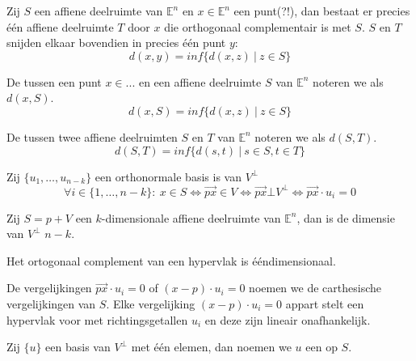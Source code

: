 \documentclass[main.tex]{subfiles}
\begin{document}
\begin{st}
  Zij $S$ een affiene deelruimte van $\mathbb{E}^{n}$ en $x\in \mathbb{E}^{n}$ een punt(?!), dan bestaat er precies \'e\'en affiene deelruimte $T$ door $x$ die orthogonaal complementair is met $S$.
  $S$ en $T$ snijden elkaar bovendien in precies \'e\'en punt $y$:
  \[ d(x,y) = inf\{ d(x,z) \ |\ z \in S  \} \]
\end{st}

\begin{de}
  De  tussen een punt $x\in ...$ en een affiene deelruimte $S$ van $\mathbb{E}^{n}$ noteren we als $d(x,S)$.
  \[ d(x,S) = inf\{ d(x,z)\ |\ z \in S \} \]
\end{de}

\begin{de}
  De  tussen twee affiene deelruimten $S$ en $T$ van $\mathbb{E}^{n}$ noteren we als $d(S,T)$.
  \[ d(S,T) = inf\{ d(s,t) \ |\ s\in S, t\in T \} \]
\end{de}

\begin{st}
  Zij $\{u_{1}, \dotsc, u_{n-k}\}$ een orthonormale basis is van $V^{\bot}$
  \[ \forall i \in \{ 1, \dotsc, n-k \} :\ x \in S \Leftrightarrow \overrightarrow{px} \in V \Leftrightarrow \overrightarrow{px} \bot V^{\bot} \Leftrightarrow \overrightarrow{px} \cdot u_{i} = 0 \]
\end{st}

\begin{st}
  Zij $S=p+V$ een $k$-dimensionale affiene deelruimte van $\mathbb{E}^{n}$, dan is de dimensie van $V^{\bot}$ $n-k$.
\end{st}

\begin{gev}
  Het ortogonaal complement van een hypervlak is \'e\'endimensionaal.
\end{gev}

\begin{de}
  De vergelijkingen $\overrightarrow{px} \cdot u_{i} = 0$ of $(x-p) \cdot u_{i} = 0$ noemen we de carthesische vergelijkingen van $S$. Elke vergelijking $(x-p)\cdot u_{i} = 0$ appart stelt een hypervlak voor met richtingsgetallen $u_{i}$ en deze zijn lineair onafhankelijk.
\end{de}

\begin{de}
  Zij $\{u\}$ een basis van $V^{\bot}$ met \'e\'en elemen, dan noemen we $u$ een  op $S$.
\end{de}
\end{document}
